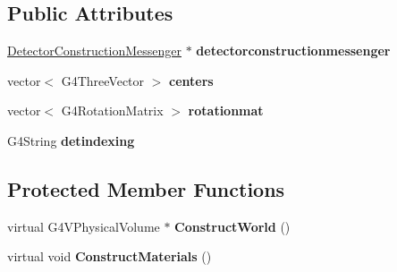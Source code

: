 \subsection*{Public Attributes}
\begin{DoxyCompactItemize}
\item 
\hypertarget{class_detector_construction_a28fb420a8023ce56fd479794087fc778}{}\label{class_detector_construction_a28fb420a8023ce56fd479794087fc778} 
\hyperlink{class_detector_construction_messenger}{Detector\+Construction\+Messenger} $\ast$ {\bfseries detectorconstructionmessenger}
\item 
\hypertarget{class_detector_construction_a02ae227b79157d974ff0e20ab6838825}{}\label{class_detector_construction_a02ae227b79157d974ff0e20ab6838825} 
vector$<$ G4\+Three\+Vector $>$ {\bfseries centers}
\item 
\hypertarget{class_detector_construction_a61939a679302d23204e8293c1e55a464}{}\label{class_detector_construction_a61939a679302d23204e8293c1e55a464} 
vector$<$ G4\+Rotation\+Matrix $>$ {\bfseries rotationmat}
\item 
\hypertarget{class_detector_construction_a5c54b134335b03a63974a411cec5441a}{}\label{class_detector_construction_a5c54b134335b03a63974a411cec5441a} 
G4\+String {\bfseries detindexing}
\end{DoxyCompactItemize}
\subsection*{Protected Member Functions}
\begin{DoxyCompactItemize}
\item 
\hypertarget{class_detector_construction_ab07aa7cce0b67683a2278ffe983f1704}{}\label{class_detector_construction_ab07aa7cce0b67683a2278ffe983f1704} 
virtual G4\+V\+Physical\+Volume $\ast$ {\bfseries Construct\+World} ()
\item 
\hypertarget{class_detector_construction_a2d88bc1a46d1d816ba63c0b488964ff4}{}\label{class_detector_construction_a2d88bc1a46d1d816ba63c0b488964ff4} 
virtual void {\bfseries Construct\+Materials} ()
\end{DoxyCompactItemize}
